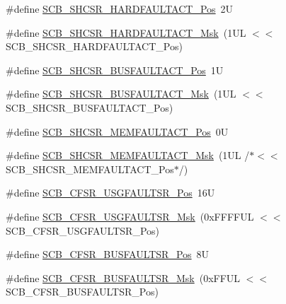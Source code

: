 \begin{DoxyCompactItemize}
\item 
\#define \mbox{\hyperlink{group___c_m_s_i_s___s_c_b_ga499ec47414b2f668c32ebb28b5889e2c}{S\+C\+B\+\_\+\+S\+H\+C\+S\+R\+\_\+\+H\+A\+R\+D\+F\+A\+U\+L\+T\+A\+C\+T\+\_\+\+Pos}}~2U
\item 
\#define \mbox{\hyperlink{group___c_m_s_i_s___s_c_b_ga5ae1ba2f88b11967bc8ca980fe411b44}{S\+C\+B\+\_\+\+S\+H\+C\+S\+R\+\_\+\+H\+A\+R\+D\+F\+A\+U\+L\+T\+A\+C\+T\+\_\+\+Msk}}~(1\+U\+L $<$$<$ S\+C\+B\+\_\+\+S\+H\+C\+S\+R\+\_\+\+H\+A\+R\+D\+F\+A\+U\+L\+T\+A\+C\+T\+\_\+\+Pos)
\item 
\#define \mbox{\hyperlink{group___c_m_s_i_s___s_c_b_gaf272760f2df9ecdd8a5fbbd65c0b767a}{S\+C\+B\+\_\+\+S\+H\+C\+S\+R\+\_\+\+B\+U\+S\+F\+A\+U\+L\+T\+A\+C\+T\+\_\+\+Pos}}~1U
\item 
\#define \mbox{\hyperlink{group___c_m_s_i_s___s_c_b_ga9d7a8b1054b655ad08d85c3c535d4f73}{S\+C\+B\+\_\+\+S\+H\+C\+S\+R\+\_\+\+B\+U\+S\+F\+A\+U\+L\+T\+A\+C\+T\+\_\+\+Msk}}~(1\+U\+L $<$$<$ S\+C\+B\+\_\+\+S\+H\+C\+S\+R\+\_\+\+B\+U\+S\+F\+A\+U\+L\+T\+A\+C\+T\+\_\+\+Pos)
\item 
\#define \mbox{\hyperlink{group___c_m_s_i_s___s_c_b_ga7c856f79a75dcc1d1517b19a67691803}{S\+C\+B\+\_\+\+S\+H\+C\+S\+R\+\_\+\+M\+E\+M\+F\+A\+U\+L\+T\+A\+C\+T\+\_\+\+Pos}}~0U
\item 
\#define \mbox{\hyperlink{group___c_m_s_i_s___s_c_b_ga9147fd4e1b12394ae26eadf900a023a3}{S\+C\+B\+\_\+\+S\+H\+C\+S\+R\+\_\+\+M\+E\+M\+F\+A\+U\+L\+T\+A\+C\+T\+\_\+\+Msk}}~(1\+U\+L /$\ast$$<$$<$ S\+C\+B\+\_\+\+S\+H\+C\+S\+R\+\_\+\+M\+E\+M\+F\+A\+U\+L\+T\+A\+C\+T\+\_\+\+Pos$\ast$/)
\item 
\#define \mbox{\hyperlink{group___c_m_s_i_s___s_c_b_gac8e4197b295c8560e68e2d71285c7879}{S\+C\+B\+\_\+\+C\+F\+S\+R\+\_\+\+U\+S\+G\+F\+A\+U\+L\+T\+S\+R\+\_\+\+Pos}}~16U
\item 
\#define \mbox{\hyperlink{group___c_m_s_i_s___s_c_b_ga565807b1a3f31891f1f967d0fa30d03f}{S\+C\+B\+\_\+\+C\+F\+S\+R\+\_\+\+U\+S\+G\+F\+A\+U\+L\+T\+S\+R\+\_\+\+Msk}}~(0x\+F\+F\+F\+F\+U\+L $<$$<$ S\+C\+B\+\_\+\+C\+F\+S\+R\+\_\+\+U\+S\+G\+F\+A\+U\+L\+T\+S\+R\+\_\+\+Pos)
\item 
\#define \mbox{\hyperlink{group___c_m_s_i_s___s_c_b_ga555a24f4f57d199f91d1d1ab7c8c3c8a}{S\+C\+B\+\_\+\+C\+F\+S\+R\+\_\+\+B\+U\+S\+F\+A\+U\+L\+T\+S\+R\+\_\+\+Pos}}~8U
\item 
\#define \mbox{\hyperlink{group___c_m_s_i_s___s_c_b_ga26dc1ddfdc37a6b92597a6f7e498c1d6}{S\+C\+B\+\_\+\+C\+F\+S\+R\+\_\+\+B\+U\+S\+F\+A\+U\+L\+T\+S\+R\+\_\+\+Msk}}~(0x\+F\+F\+U\+L $<$$<$ S\+C\+B\+\_\+\+C\+F\+S\+R\+\_\+\+B\+U\+S\+F\+A\+U\+L\+T\+S\+R\+\_\+\+Pos)

\end{DoxyCompactItemize}
